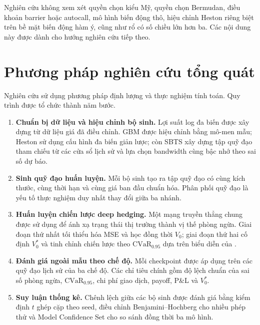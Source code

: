Nghiên cứu không xem xét quyền chọn kiểu Mỹ, quyền chọn Bermudan, điều khoản
barrier hoặc autocall, mô hình biến động thô, hiệu chỉnh Heston riêng biệt trên
bề mặt biến động hàm ý, cũng như rổ có số chiều lớn hơn ba. Các nội dung này
được dành cho hướng nghiên cứu tiếp theo.

\section{Phương pháp nghiên cứu tổng quát}
\label{sec:phuong-phap-tong-quat}

Nghiên cứu sử dụng phương pháp định lượng và thực nghiệm tính toán. Quy trình
được tổ chức thành năm bước.

\begin{enumerate}
    \item \textbf{Chuẩn bị dữ liệu và hiệu chỉnh bộ sinh.} Lợi suất log đa
    biến được xây dựng từ dữ liệu giá đã điều chỉnh. \textsc{GBM} được hiệu
    chỉnh bằng mô-men mẫu; Heston sử dụng cấu hình đa biến giản lược; còn
    \textsc{SBTS} xây dựng tập quỹ đạo tham chiếu từ các cửa sổ lịch sử và lựa
    chọn bandwidth cùng bậc nhớ theo sai số dự báo.

    \item \textbf{Sinh quỹ đạo huấn luyện.} Mỗi bộ sinh tạo ra tập quỹ đạo có
    cùng kích thước, cùng thời hạn và cùng giá ban đầu chuẩn hóa. Phân phối quỹ
    đạo là yếu tố thực nghiệm duy nhất thay đổi giữa ba nhánh.

    \item \textbf{Huấn luyện chiến lược deep hedging.} Một mạng truyền thẳng
    chung được sử dụng để ánh xạ trạng thái thị trường thành vị thế phòng ngừa.
    Giai đoạn thứ nhất tối thiểu hóa MSE và học đồng thời $V_0$; giai đoạn thứ
    hai cố định $V_0^{*}$ và tinh chỉnh chiến lược theo
    $\mathrm{CVaR}_{0.95}$ dựa trên biểu diễn của
    \textcite{Rockafellar2000}.

    \item \textbf{Đánh giá ngoài mẫu theo chế độ.} Mỗi checkpoint được áp dụng
    trên các quỹ đạo lịch sử của ba chế độ. Các chỉ tiêu chính gồm độ lệch
    chuẩn của sai số phòng ngừa, $\mathrm{CVaR}_{0.95}$, chi phí giao dịch,
    payoff, P\&L và $V_0^{*}$.

    \item \textbf{Suy luận thống kê.} Chênh lệch giữa các bộ sinh được đánh giá
    bằng kiểm định $t$ ghép cặp theo seed, điều chỉnh Benjamini--Hochberg cho
    nhiều phép thử và Model Confidence Set cho so sánh đồng thời ba mô hình.
\end{enumerate}


